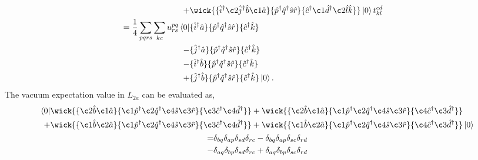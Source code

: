 \begin{align}
\begin{aligned}
{            } \\
            +
            &\wick{
            \{\hat{i}^\dagger \c2{\hat{j}}^\dagger \hat{b} \c1{\hat{a}} \}
            \{\hat{p}^\dagger \hat{q}^\dagger \hat{s} \hat{r} \}
            \{\hat{c}^\dagger \c1{\hat{d}^\dagger} \c2{\hat{l}} \hat{k} \}
            }
            \ket{0}t^{cd}_{kl} \\
        = \frac{1}{4} \sum_{pqrs} \sum_{kc} u^{pq}_{rs} \bra{0}
            &\{\hat{i}^\dagger \hat{a}\}
            \{\hat{p}^\dagger \hat{q}^\dagger \hat{s} \hat{r} \}
            \{\hat{c}^\dagger \hat{k} \} 
            \\ -
            &\{\hat{j}^\dagger \hat{a} \}
            \{\hat{p}^\dagger \hat{q}^\dagger \hat{s} \hat{r} \}
            \{\hat{c}^\dagger \hat{k} \} 
            \\ -
            &\{\hat{i}^\dagger \hat{b} \}
            \{\hat{p}^\dagger \hat{q}^\dagger \hat{s} \hat{r} \}
            \{\hat{c}^\dagger \hat{k} \} 
            \\ +
            &\{\hat{j}^\dagger \hat{b} \}
            \{\hat{p}^\dagger \hat{q}^\dagger \hat{s} \hat{r} \}
            \{\hat{c}^\dagger \hat{k} \} 
        \ket{0}.
    \end{aligned}
\end{align}
The vacuum expectation value in $L_{2a}$ can be evaluated as,
\begin{gather}
    \begin{aligned}
        \bra{0}
            &\wick{
            \{ \c2{\hat{b}} \c1{\hat{a}} \}
            \{ \c1{\hat{p}}^\dagger \c2{\hat{q}}^\dagger \c4{\hat{s}} \c3{\hat{r}} \}
            \{ \c3{\hat{c}}^\dagger \c4{\hat{d}}^\dagger \}
            } +
            \wick{
            \{ \c2{\hat{b}} \c1{\hat{a}} \}
            \{ \c1{\hat{p}}^\dagger \c2{\hat{q}}^\dagger \c4{\hat{s}} \c3{\hat{r}} \}
            \{ \c4{\hat{c}}^\dagger \c3{\hat{d}}^\dagger \}
            } \\ +
            &\wick{
            \{ \c1{\hat{b}} \c2{\hat{a}} \}
            \{ \c1{\hat{p}}^\dagger \c2{\hat{q}}^\dagger \c4{\hat{s}} \c3{\hat{r}} \}
            \{ \c3{\hat{c}}^\dagger \c4{\hat{d}}^\dagger \}
            } +
            \wick{
            \{ \c1{\hat{b}} \c2{\hat{a}} \}
            \{ \c1{\hat{p}}^\dagger \c2{\hat{q}}^\dagger \c4{\hat{s}} \c3{\hat{r}} \}
            \{ \c4{\hat{c}}^\dagger \c3{\hat{d}}^\dagger \}
            }
            \ket{0}
    \end{aligned} \\
    \begin{aligned}
         =&\delta_{bq}\delta_{ap}\delta_{sd}\delta_{rc}
          -\delta_{bq}\delta_{ap}\delta_{sc}\delta_{rd} \\
         -&\delta_{aq}\delta_{bp}\delta_{sd}\delta_{rc}
         + \delta_{aq}\delta_{bp}\delta_{sc}\delta_{rd}
    \end{aligned}
\end{gather}

